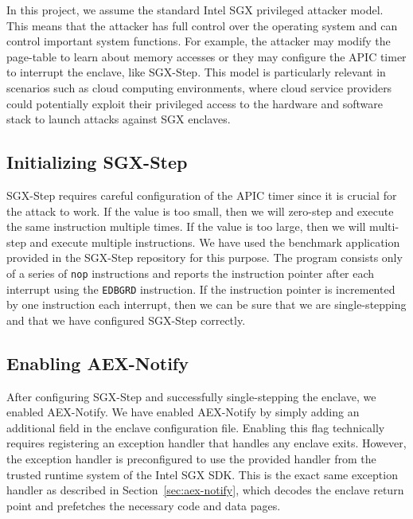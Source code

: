 \documentclass{llncs}
\begin{document}
In this project, we assume the standard Intel SGX privileged attacker model.
This means that the attacker has full control over the operating system
and can control important system functions.
For example, the attacker may modify the page-table to learn about memory accesses
or they may configure the APIC timer to interrupt the enclave, like SGX-Step.
This model is particularly relevant in scenarios such as cloud computing
environments, where cloud service providers could potentially exploit their
privileged access to the hardware and software stack to launch attacks against SGX enclaves.

\subsection{Initializing SGX-Step}


SGX-Step requires careful configuration of the APIC timer
since it is crucial for the attack to work.
If the value is too small, then we will zero-step and execute the same instruction multiple times.
If the value is too large, then we will multi-step and execute multiple instructions.
We have used the benchmark application provided in the SGX-Step repository for this purpose.
The program consists only of a series of \texttt{nop} instructions and
reports the instruction pointer after each interrupt using the \texttt{EDBGRD} instruction.
If the instruction pointer is incremented by one instruction each interrupt,
then we can be sure that we are single-stepping and
that we have configured SGX-Step correctly.

\subsection{Enabling AEX-Notify}

After configuring SGX-Step and successfully single-stepping the enclave,
we enabled AEX-Notify.
We have enabled AEX-Notify by simply adding an additional field in the enclave configuration file.
Enabling this flag technically requires registering an exception handler that handles any enclave exits.
However, the exception handler is preconfigured to use the provided handler
from the trusted runtime system of the Intel SGX SDK.
This is the exact same exception handler as described in Section~\ref{sec:aex-notify},
which decodes the enclave return point and prefetches the necessary code and data pages.
\end{document}
